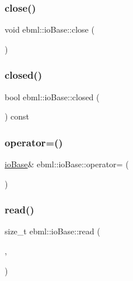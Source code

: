 \subsubsection{\texorpdfstring{close()}{close()}}
{\footnotesize\ttfamily void ebml\+::io\+Base\+::close (\begin{DoxyParamCaption}{ }\end{DoxyParamCaption})}

\mbox{\label{classebml_1_1ioBase_a9dea7dea0e8d87a537e652e7f40128e9}} 
\subsubsection{\texorpdfstring{closed()}{closed()}}
{\footnotesize\ttfamily bool ebml\+::io\+Base\+::closed (\begin{DoxyParamCaption}{ }\end{DoxyParamCaption}) const}

\mbox{\label{classebml_1_1ioBase_acdce9702e9511b87d0bea6b73b2fda5e}} 
\subsubsection{\texorpdfstring{operator=()}{operator=()}}
{\footnotesize\ttfamily \mbox{\hyperlink{classebml_1_1ioBase}{io\+Base}}\& ebml\+::io\+Base\+::operator= (\begin{DoxyParamCaption}\item[{const \mbox{\hyperlink{classebml_1_1ioBase}{io\+Base}} \&}]{ }\end{DoxyParamCaption})\hspace{0.3cm}{\ttfamily [protected]}}

\mbox{\label{classebml_1_1ioBase_a3c2cd427ce1fd34a93959778a3fd4efa}} 
\subsubsection{\texorpdfstring{read()}{read()}\hspace{0.1cm}{\footnotesize\ttfamily [1/2]}}
{\footnotesize\ttfamily size\+\_\+t ebml\+::io\+Base\+::read (\begin{DoxyParamCaption}\item[{char $\ast$}]{,  }\item[{size\+\_\+t}]{ }\end{DoxyParamCaption})}

